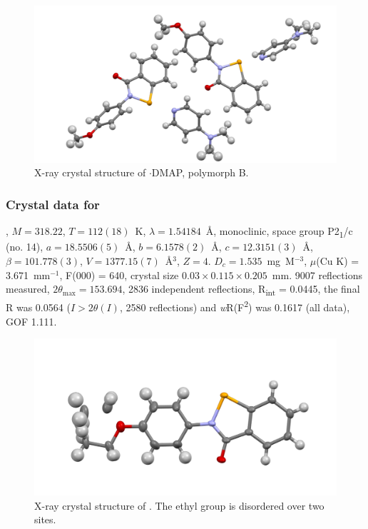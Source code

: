\begin{refsection}
\begin{figure}
  \includegraphics[width=0.6\linewidth]{Figures/ebs-4ome-dmap-b-xtal.pdf}
  \caption{X-ray crystal structure of \texorpdfstring{$ \cdot $DMAP}{C21 H21 N3 O2 Se}, polymorph B.}
\end{figure}

\subsubsection{Crystal data for \texorpdfstring{}{C15 H13 N O2 Se}}
, $M=318.22$, $T=112(18)$~K, $\lambda=1.54184$~\AA, monoclinic, space group P2\textsubscript{1}/c (no. 14), $a = 18.5506(5)$~\AA, $b = 6.1578(2)$~\AA, $c = 12.3151(3)$~\AA, $\beta = 101.778(3)$\degree, $V = 1377.15(7)$~\AA$^{3}$, $Z = 4$. $D_{c}= 1.535$~mg~M$^{-3}$, $\mu$(Cu K\a) = 3.671~mm$^{-1}$, F(000) = 640, crystal size $0.03 \times 0.115 \times 0.205$~mm. 9007 reflections measured, $2\theta_{\max}=153.694$\degree, 2836 independent reflections, R\textsubscript{int} = 0.0445, the final R was 0.0564 ($I > 2\theta(I)$, 2580 reflections) and \textit{w}R(F\textsuperscript{2}) was 0.1617 (all data), GOF 1.111.

\begin{figure}
  \includegraphics[width=0.6\linewidth]{Figures/ebs-4oet-xtal.pdf}
  \caption[X-ray crystal structure of \texorpdfstring{}{C15 H13 N O2 Se}.]{X-ray crystal structure of \texorpdfstring{}{C15 H13 N O2 Se}. The ethyl group is disordered over two sites.}
\end{figure}


\end{refsection}
